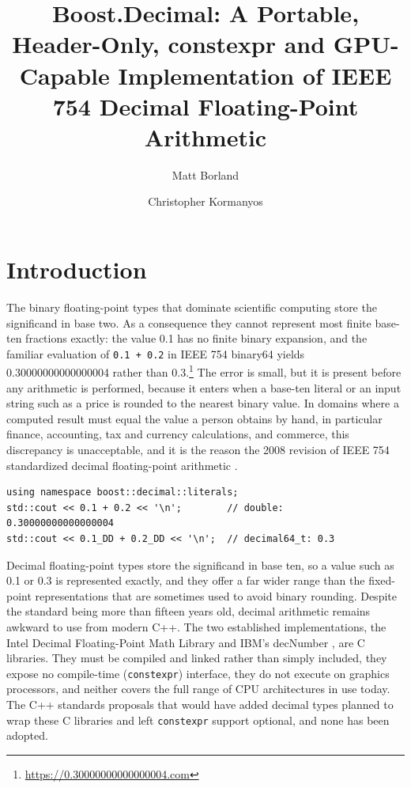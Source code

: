 \documentclass[acmsmall]{acmart}
\title[Boost.Decimal: Portable IEEE 754 Decimal Floating-Point]{Boost.Decimal:
  A Portable, Header-Only, constexpr and GPU-Capable Implementation of
  IEEE 754 Decimal Floating-Point Arithmetic}
\author{Matt Borland}
\affiliation{%
  \institution{The C++ Alliance}
  \country{USA}}
\author{Christopher Kormanyos}
\affiliation{%
  \institution{Independent Researcher}
  \country{Germany}}
\begin{document}
\maketitle

\section{Introduction}
\label{sec:intro}

The binary floating-point types that dominate scientific computing store the
significand in base two. As a consequence they cannot represent most finite
base-ten fractions exactly: the value 0.1 has no finite binary expansion, and the
familiar evaluation of \texttt{0.1 + 0.2} in IEEE 754 binary64 yields
0.30000000000000004 rather than 0.3.\footnote{\url{https://0.30000000000000004.com}}
The error is small, but it is present before any arithmetic is performed, because
it enters when a base-ten literal or an input string such as a price is rounded to
the nearest binary value. In domains where a computed result must equal the value a
person obtains by hand, in particular finance, accounting, tax and currency
calculations, and commerce, this discrepancy is unacceptable, and it is the reason
the 2008 revision of IEEE 754 standardized decimal floating-point arithmetic
\cite{IEEE754-2008, Cowlishaw2003}.

\begin{lstlisting}[caption={Binary \texttt{double} rounds the literals 0.1 and 0.2; the
  decimal type represents them exactly.},label={lst:point}]
using namespace boost::decimal::literals;
std::cout << 0.1 + 0.2 << '\n';        // double:      0.30000000000000004
std::cout << 0.1_DD + 0.2_DD << '\n';  // decimal64_t: 0.3
\end{lstlisting}

Decimal floating-point types store the significand in base ten, so a value such as
0.1 or 0.3 is represented exactly, and they offer a far wider range than the
fixed-point representations that are sometimes used to avoid binary rounding.
Despite the standard being more than fifteen years old, decimal arithmetic remains
awkward to use from modern C++. The two established implementations, the Intel
Decimal Floating-Point Math Library \cite{cornea2009, intel-dfp} and IBM's decNumber
\cite{ibm-decnumber}, are C libraries. They must be compiled and linked rather than
simply included, they expose no compile-time (\texttt{constexpr}) interface, they do
not execute on graphics processors, and neither covers the full range of CPU
architectures in use today. The C++ standards proposals that would have added
decimal types \cite{tr24733, wg21-n3407, wg21-n3871} planned to wrap these C
libraries and left \texttt{constexpr} support optional, and none has been adopted.
\end{document}
